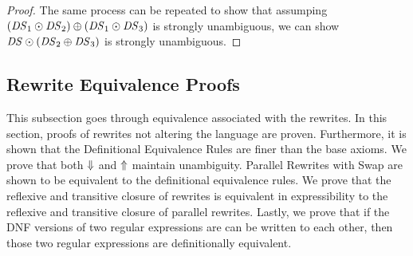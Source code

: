 \documentclass[acmsmall]{acmart}
\begin{document}
\begin{proof}
  The same process can be repeated to show that assumping
  $(\mathit{DS}_1 \odot \mathit{DS}_2) \oplus
  (\mathit{DS}_1 \odot \mathit{DS}_3)$ is strongly unambiguous, we can show
  $\mathit{DS} \odot (\mathit{DS}_2 \oplus \mathit{DS}_3)$ is strongly unambiguous.
\end{proof}


\subsection{Rewrite Equivalence Proofs}
\label{rewrite-proofs}

This subsection goes through equivalence associated with the rewrites.  In this
section, proofs of rewrites not altering the language are proven.  Furthermore,
it is shown that the Definitional Equivalence Rules are finer than the base
axioms.  We prove that both $\Downarrow$ and $\Uparrow$ maintain unambiguity.
Parallel Rewrites with Swap are shown to be equivalent to the definitional
equivalence rules.
We prove that the reflexive and transitive closure of rewrites is equivalent in
expressibility to the reflexive and transitive closure of parallel rewrites.
Lastly, we prove that if the DNF versions of two regular expressions are can be
written to each other, then those two regular expressions are definitionally
equivalent.
\end{document}
